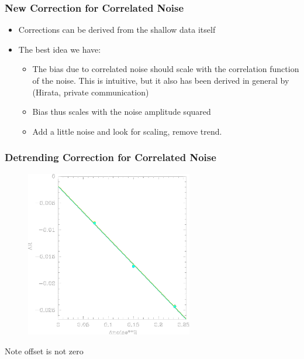\documentclass{beamer}
\begin{document}
\frame
{
    \frametitle{New Correction for Correlated Noise}

 
    \begin{itemize}

        \item Corrections can be derived from the shallow data itself

        \item The best idea we have:
            \begin{itemize}

                \item The bias due to correlated noise should scale with the
                    {\color{gold} correlation function} of the noise.
                    This is intuitive, but it also has been derived in general
                    by (Hirata, private communication)

                \item Bias thus scales with the {\color{gold} noise} amplitude squared

                \item Add a little noise and look for scaling, remove trend.

            \end{itemize}
    \end{itemize}

}



\frame
{
    \frametitle{Detrending Correction for Correlated Noise}

    \begin{figure}
        \includegraphics[width=0.65\textwidth]{run-bd13mcal-dt01-Rnoise-detrend-neg.png}
    \end{figure}

    Note offset is not zero
}
\end{document}

